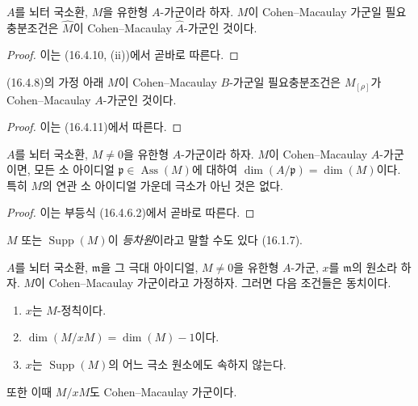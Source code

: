 \begin{proposition}[16.5.2]
\label{0.16.5.2-fr}
$A$를 뇌터 국소환, $M$을 유한형 $A$-가군이라 하자. $M$이
Cohen--Macaulay 가군일 필요충분조건은 $\widehat M$이
Cohen--Macaulay $\widehat A$-가군인 것이다.
\end{proposition}

\begin{proof}
이는 (16.4.10, (ii))에서 곧바로 따른다.
\end{proof}

\begin{proposition}[16.5.3]
\label{0.16.5.3-fr}
(16.4.8)의 가정 아래 $M$이 Cohen--Macaulay $B$-가군일
필요충분조건은 $M_{[\rho]}$가 Cohen--Macaulay $A$-가군인 것이다.
\end{proposition}

\begin{proof}
이는 (16.4.11)에서 따른다.
\end{proof}

\begin{proposition}[16.5.4]
\label{0.16.5.4-fr}
$A$를 뇌터 국소환, $M\neq0$을 유한형 $A$-가군이라 하자. $M$이
Cohen--Macaulay $A$-가군이면, 모든 소 아이디얼
$\mathfrak{p}\in\operatorname{Ass}(M)$에 대하여
$\dim(A/\mathfrak{p})=\dim(M)$이다. 특히 $M$의 연관 소 아이디얼
가운데 극소가 아닌 것은 없다.
\end{proposition}

\begin{proof}
이는 부등식 (16.4.6.2)에서 곧바로 따른다.
\end{proof}

$M$ 또는 $\operatorname{Supp}(M)$이 \emph{등차원}이라고 말할 수도
있다 (16.1.7).


\begin{proposition}[16.5.5]
\label{0.16.5.5-fr}
$A$를 뇌터 국소환, $\mathfrak{m}$을 그 극대 아이디얼,
$M\neq0$을 유한형 $A$-가군, $x$를 $\mathfrak{m}$의 원소라 하자.
$M$이 Cohen--Macaulay 가군이라고 가정하자. 그러면 다음 조건들은
동치이다.
\begin{enumerate}
  \item[a)] $x$는 $M$-정칙이다.
  \item[b)] $\dim(M/xM)=\dim(M)-1$이다.
  \item[c)] $x$는 $\operatorname{Supp}(M)$의 어느 극소 원소에도
  속하지 않는다.
\end{enumerate}
또한 이때 $M/xM$도 Cohen--Macaulay 가군이다.
\end{proposition}

